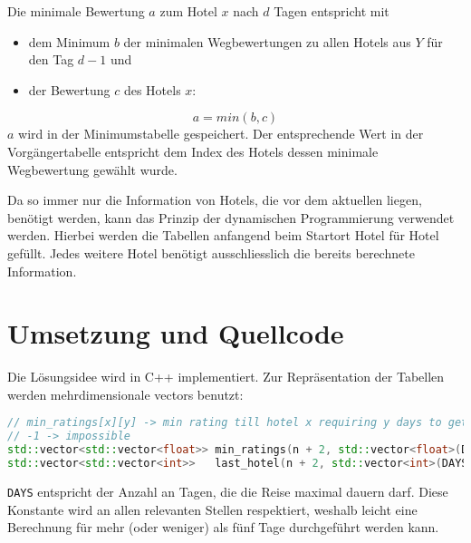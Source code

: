 \documentclass[a4paper,10pt,ngerman]{scrartcl}
\begin{document}
Die minimale Bewertung $a$ zum Hotel $x$ nach $d$ Tagen entspricht mit
\begin{itemize}
    \item dem Minimum $b$ der minimalen Wegbewertungen zu allen Hotels aus $Y$ für den Tag $d-1$ und
    \item der Bewertung $c$ des Hotels $x$:
\end{itemize}
\begin{equation*}
    a = min(b, c)
\end{equation*}
$a$ wird in der Minimumstabelle gespeichert.
Der entsprechende Wert in der Vorgängertabelle entspricht dem Index des Hotels dessen minimale Wegbewertung gewählt wurde.

\medskip
Da so immer nur die Information von Hotels, die vor dem aktuellen liegen, benötigt werden, kann das Prinzip der dynamischen Programmierung verwendet werden.
Hierbei werden die Tabellen anfangend beim Startort Hotel für Hotel gefüllt.
Jedes weitere Hotel benötigt ausschliesslich die bereits berechnete Information.

\section{Umsetzung und Quellcode}
Die Lösungsidee wird in C++ implementiert.
Zur Repräsentation der Tabellen werden mehrdimensionale vectors benutzt:
\begin{lstlisting}[language=C++]
// min_ratings[x][y] -> min rating till hotel x requiring y days to get to
// -1 -> impossible
std::vector<std::vector<float>> min_ratings(n + 2, std::vector<float>(DAYS + 1, -1));
std::vector<std::vector<int>>   last_hotel(n + 2, std::vector<int>(DAYS + 1, -1));
\end{lstlisting}
\lstinline{DAYS} entspricht der Anzahl an Tagen, die die Reise maximal dauern darf.
Diese Konstante wird an allen relevanten Stellen respektiert, weshalb leicht eine Berechnung für mehr (oder weniger) als fünf Tage durchgeführt werden kann.
\end{document}

